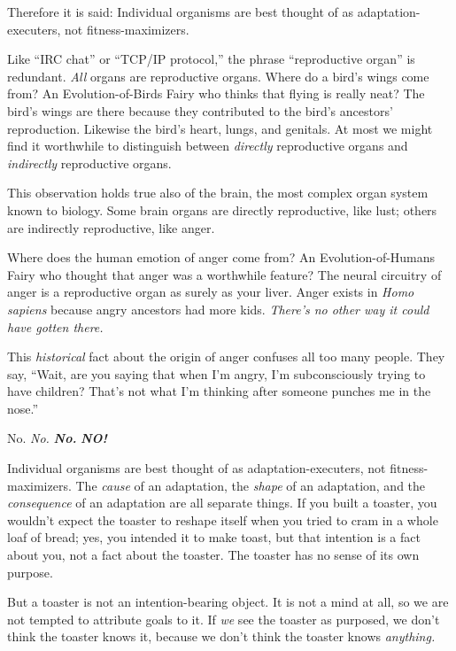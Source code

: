  Therefore it is said: Individual organisms are best thought of as
adaptation-executers, not fitness-maximizers.

\myendsectiontext


\bigskip



 Like ``IRC chat'' or
``TCP/IP protocol,'' the phrase
``reproductive organ'' is redundant.
\textit{All} organs are reproductive organs. Where do a
bird's wings come from? An Evolution-of-Birds Fairy who
thinks that flying is really neat? The bird's wings are
there because they contributed to the bird's
ancestors' reproduction. Likewise the
bird's heart, lungs, and genitals. At most we might
find it worthwhile to distinguish between \textit{directly}
reproductive organs and \textit{indirectly} reproductive organs. 


 This observation holds true also of the brain, the most complex
organ system known to biology. Some brain organs are directly
reproductive, like lust; others are indirectly reproductive, like
anger.

{
 Where does the human emotion of anger come from? An
Evolution-of-Humans Fairy who thought that anger was a worthwhile
feature? The neural circuitry of anger is a reproductive organ as
surely as your liver. Anger exists in \textit{Homo sapiens} because
angry ancestors had more kids. \textit{There's no other
way it could have gotten there.}}


 This \textit{historical} fact about the origin of anger confuses
all too many people. They say, ``Wait, are you saying
that when I'm angry, I'm subconsciously
trying to have children? That's not what
I'm thinking after someone punches me in the
nose.''


 No. \textit{No.} \textbf{\textit{No.}} \textbf{\textit{NO!}}


 Individual organisms are best thought of as adaptation-executers,
not fitness-maximizers. The \textit{cause} of an adaptation, the
\textit{shape} of an adaptation, and the \textit{consequence} of an
adaptation are all separate things. If you built a toaster, you
wouldn't expect the toaster to reshape itself when you
tried to cram in a whole loaf of bread; yes, you intended it to make
toast, but that intention is a fact about you, not a fact about the
toaster. The toaster has no sense of its own purpose.


 But a toaster is not an intention-bearing object. It is not a mind
at all, so we are not tempted to attribute goals to it. If \textit{we}
see the toaster as purposed, we don't think the toaster
knows it, because we don't think the toaster knows
\textit{anything.}



